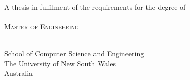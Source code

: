 \documentclass[preamble.tex]{subfiles}
\begin{document}
\centering
\large
\begin{singlespacing}
~\\~\\~\\
A thesis in fulfilment of the requirements for the degree of
~\\~\\
\textsc{Master of Engineering}
~\\~\\
\end{singlespacing}
School of Computer Science and Engineering
~\\
The University of New South Wales
~\\
Australia
~\\
\end{document}
